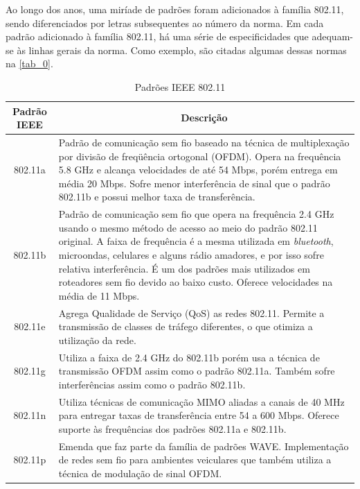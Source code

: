 \documentclass[
12pt,				%
openright,			%
oneside,			%
a4paper,			%
brazil,				%
]{abntex2}
\begin{document}
	\par Ao longo dos anos, uma miríade de padrões foram adicionados à família 802.11, sendo diferenciados por letras subsequentes ao número da norma. Em cada padrão adicionado à família 802.11, há uma série de especificidades que adequam-se às linhas gerais da norma. Como exemplo, são citadas algumas dessas normas na \autoref{tab_0}.
	
	\begin{table}[H]
		\centering
		\renewcommand{\arraystretch}{1.5}
		\begin{tabular}{|c|p{12cm}|} \hline
		\textbf{Padrão IEEE} & \multicolumn{1}{c|}{\textbf{Descrição}} \\ \hline
		802.11a & Padrão de comunicação sem fio baseado na técnica de multiplexação por divisão de freqüência ortogonal (OFDM). Opera na frequência 5.8 GHz e alcança velocidades de até 54 Mbps, porém entrega em média 20 Mbps. Sofre menor interferência de sinal que o padrão 802.11b e possui melhor taxa de transferência.\\ \hline
		802.11b & Padrão de comunicação sem fio que opera na frequência 2.4 GHz usando o mesmo método de acesso ao meio do padrão 802.11 original. A faixa de frequência é a mesma utilizada em \textit{bluetooth}, microondas, celulares e alguns rádio amadores, e por isso sofre relativa interferência. É um dos padrões mais utilizados em roteadores sem fio devido ao baixo custo. Oferece velocidades na média de 11 Mbps.\\ \hline
		802.11e & Agrega Qualidade de Serviço (QoS) as redes 802.11. Permite a transmissão de classes de tráfego diferentes, o que otimiza a utilização da rede.\\ \hline
		802.11g & Utiliza a faixa de 2.4 GHz do 802.11b porém usa a técnica de transmissão OFDM assim como o padrão 802.11a. Também sofre interferências assim como o padrão 802.11b.\\ \hline
		802.11n & Utiliza técnicas de comunicação MIMO aliadas a canais de 40 MHz para entregar taxas de transferência entre 54 a 600 Mbps. Oferece suporte às frequências dos padrões 802.11a e 802.11b.\\ \hline
		802.11p & Emenda que faz parte da família de padrões WAVE. Implementação de redes sem fio para ambientes veiculares que também utiliza a técnica de modulação de sinal OFDM. \\ \hline		
		\end{tabular}
		\caption{\label{tab_0}Padrões IEEE 802.11}
	\end{table}
	
\end{document}
